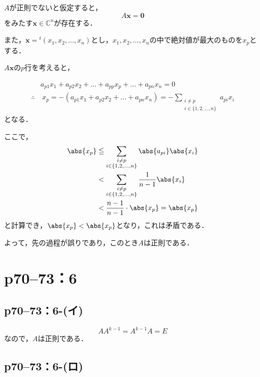 \begin{tproof}
  $A$が正則でないと仮定すると，
  \[
    A \bm{x} = \bm{0}
  \]
  をみたす$\bm{x} \in \mathbb{C}^n$が存在する．

  また，$\bm{x} ={} ^t (x_1,x_2,\dots,x_n)$とし，$x_1,x_2,\dots,x_n$の中で絶対値が最大のものを$x_p$とする．

  $A \bm{x}$の$p$行を考えると，

  \begin{align*}
               & a_{p1} x_1 + a_{p2} x_2 + \dots + a_{pp} x_p + \dots + a_{pn} x_n = 0            \\
    \therefore & ~ x_p = -(a_{p1}x_1 + a_{p2} x_2+ \dots + a_{pn} x_n) =- \sum_{\substack{i \ne p \\ i \in \{1,2,\dots,n\}}} a_{pi} x_i
  \end{align*}
  となる．

  ここで，
  \begin{align*}
    \abs{x_p} & \leqq \sum_{\substack{i \ne p                \\ i \in \{1,2,\dots,n\}}} \abs{a_{pi}} \abs{x_i} \\
              & < \sum_{\substack{i \ne p                    \\ i \in \{1,2,\dots,n\}}} \frac{1}{n-1} \abs{x_i} \\
              & < \frac{n-1}{n-1} \cdot \abs{x_p} =\abs{x_p}
  \end{align*}
  と計算でき，$ \abs{x_p} < \abs{x_p}$となり，これは矛盾である．

  よって，先の過程が誤りであり，このとき$A$は正則である．
\end{tproof}


\section*{p70--73：6}

\subsection*{p70--73：6-(イ)}
\begin{tproof}
  \[
    A A^{k-1} = A^{k-1} A = E
  \]
  なので，$A$は正則である．
\end{tproof}

\subsection*{p70--73：6-(ロ)}


